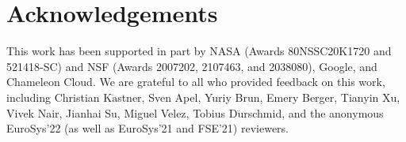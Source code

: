 \section*{Acknowledgements} This work has been supported in part by NASA (Awards 80NSSC20K1720 and 521418-SC) and NSF (Awards 2007202, 2107463, and 2038080), Google, and Chameleon Cloud. We are grateful to all who provided feedback on this work, including Christian K$\ddot{\text{a}} $stner, Sven Apel, Yuriy Brun, Emery Berger, Tianyin Xu, Vivek Nair, Jianhai Su, Miguel Velez, Tobius D$\ddot{\text{u}}$rschmid, and the anonymous EuroSys'22 (as well as EuroSys'21 and FSE'21) reviewers. 
